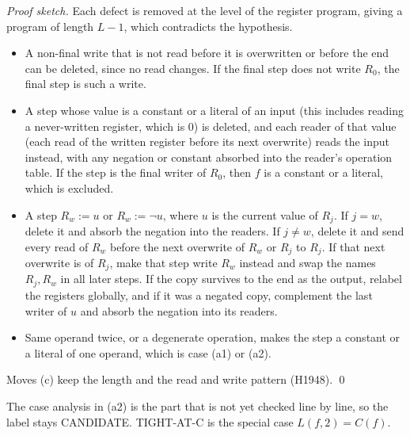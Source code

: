 \documentclass[11pt]{article}
\begin{document}
\emph{Proof sketch.} Each defect is removed at the level of the register program, giving a program of length $L-1$, which contradicts the hypothesis.
\begin{itemize}
\item[(b)] A non-final write that is not read before it is overwritten or before the end can be deleted, since no read changes. If the final step does not write $R_0$, the final step is such a write.
\item[(a1)] A step whose value is a constant or a literal of an input (this includes reading a never-written register, which is $0$) is deleted, and each reader of that value (each read of the written register before its next overwrite) reads the input instead, with any negation or constant absorbed into the reader's operation table. If the step is the final writer of $R_0$, then $f$ is a constant or a literal, which is excluded.
\item[(a2)] A step $R_w:=u$ or $R_w:=\neg u$, where $u$ is the current value of $R_j$. If $j=w$, delete it and absorb the negation into the readers. If $j\ne w$, delete it and send every read of $R_w$ before the next overwrite of $R_w$ or $R_j$ to $R_j$. If that next overwrite is of $R_j$, make that step write $R_w$ instead and swap the names $R_j,R_w$ in all later steps. If the copy survives to the end as the output, relabel the registers globally, and if it was a negated copy, complement the last writer of $u$ and absorb the negation into its readers.
\item[(a3)] Same operand twice, or a degenerate operation, makes the step a constant or a literal of one operand, which is case (a1) or (a2).
\end{itemize}
Moves (c) keep the length and the read and write pattern (H1948). \qed

The case analysis in (a2) is the part that is not yet checked line by line, so the label stays CANDIDATE. TIGHT-AT-C is the special case $L(f,2)=C(f)$.
\end{document}
